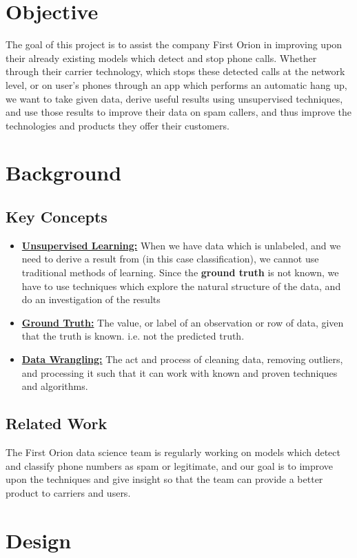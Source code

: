 \documentclass[20pt]{article} %
\begin{document}
\section{Objective}
The goal of this project is to assist the company First Orion in improving upon their already existing models which detect and stop phone calls.  Whether through their carrier technology, which stops these detected calls at the network level, or on user’s phones through an app which performs an automatic hang up, we want to take given data, derive useful results using unsupervised techniques, and use those results to improve their data on spam callers, and thus improve the technologies and products they offer their customers.

\newpage
\section{Background}
\subsection{Key Concepts}
\begin{itemize}
\item \textbf{\underline{Unsupervised Learning:}} When we have data which is unlabeled, and we need to derive a result from (in this case classification), we cannot use traditional methods of learning. Since the \textbf{ground truth} is not known, we have to use techniques which explore the natural structure of the data, and do an investigation of the results
\item \textbf{\underline{Ground Truth:}} The value, or label of an observation or row of data, given that the truth is known. i.e. not the predicted truth.
\item \textbf{\underline{Data Wrangling:}} The act and process of cleaning data, removing outliers, and processing it such that it can work with known and proven techniques and algorithms.
\end{itemize}

\subsection{Related Work}
The First Orion data science team is regularly working on models which detect and classify phone numbers as spam or legitimate, and our goal is to improve upon the techniques and give insight so that the team can provide a better product to carriers and users.

\section{Design}
\end{document}
